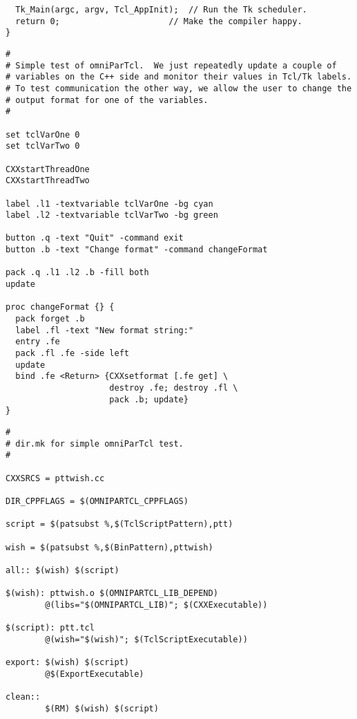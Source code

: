 \documentclass[11pt,twoside,onecolumn]{article}
\begin{document}
{\begin{verbatim}
  Tk_Main(argc, argv, Tcl_AppInit);  // Run the Tk scheduler.
  return 0;	                     // Make the compiler happy.
}
\end{verbatim}
}

\newpage
{\small
\begin{verbatim}
#
# Simple test of omniParTcl.  We just repeatedly update a couple of 
# variables on the C++ side and monitor their values in Tcl/Tk labels.
# To test communication the other way, we allow the user to change the
# output format for one of the variables.
#

set tclVarOne 0
set tclVarTwo 0

CXXstartThreadOne
CXXstartThreadTwo

label .l1 -textvariable tclVarOne -bg cyan
label .l2 -textvariable tclVarTwo -bg green

button .q -text "Quit" -command exit
button .b -text "Change format" -command changeFormat

pack .q .l1 .l2 .b -fill both
update

proc changeFormat {} {
  pack forget .b  
  label .fl -text "New format string:"
  entry .fe 
  pack .fl .fe -side left
  update
  bind .fe <Return> {CXXsetformat [.fe get] \
                     destroy .fe; destroy .fl \
                     pack .b; update}
}
\end{verbatim}
}


\newpage
{\small
\begin{verbatim}
#
# dir.mk for simple omniParTcl test.
#

CXXSRCS = pttwish.cc

DIR_CPPFLAGS = $(OMNIPARTCL_CPPFLAGS)

script = $(patsubst %,$(TclScriptPattern),ptt)

wish = $(patsubst %,$(BinPattern),pttwish)

all:: $(wish) $(script)

$(wish): pttwish.o $(OMNIPARTCL_LIB_DEPEND)
        @(libs="$(OMNIPARTCL_LIB)"; $(CXXExecutable))

$(script): ptt.tcl
        @(wish="$(wish)"; $(TclScriptExecutable))

export: $(wish) $(script)
        @$(ExportExecutable)

clean::
        $(RM) $(wish) $(script)
\end{verbatim}
}
\end{document}
